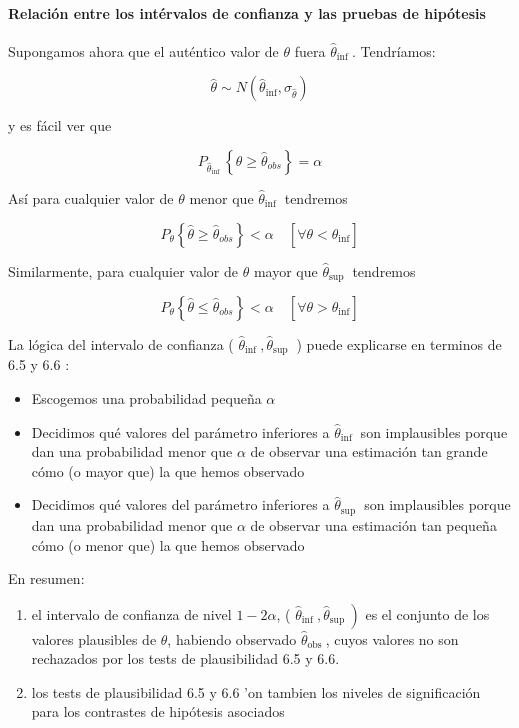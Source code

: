 \documentclass[
]{article}
\providecommand{\tightlist}{%
  \setlength{\itemsep}{0pt}\setlength{\parskip}{0pt}}
\begin{document}
\paragraph{Relación entre los intérvalos de confianza y las pruebas de hipótesis}\label{relaciuxf3n-entre-los-intuxe9rvalos-de-confianza-y-las-pruebas-de-hipuxf3tesis}

Supongamos ahora que el auténtico valor de \(\theta\) fuera \(\hat{\theta}_{\text {ínf }}\). Tendríamos:

\[
\hat{\theta} \sim N\left(\hat{\theta}_{\mathrm{inf}}, \sigma_{\hat{\theta}}\right)
\]

y es fácil ver que

\[
P_{\hat{\theta}_{\text {inf }}}\left\{\hat{\theta} \geq \hat{\theta}_{o b s}\right\}=\alpha
\]

Así para cualquier valor de \(\theta\) menor que \(\hat{\theta}_{\text {inf }}\) tendremos

\[
P_{\theta}\left\{\hat{\theta} \geq \hat{\theta}_{o b s}\right\}<\alpha \quad\left[\forall \theta<\hat{\theta}_{\mathrm{inf}}\right]
\]

Similarmente, para cualquier valor de \(\theta\) mayor que \(\hat{\theta}_{\text {sup }}\) tendremos

\[
P_{\theta}\left\{\hat{\theta} \leq \hat{\theta}_{o b s}\right\}<\alpha \quad\left[\forall \theta>\hat{\theta}_{\mathrm{inf}}\right]
\]

La lógica del intervalo de confianza ( \(\hat{\theta}_{\text {inf }}, \hat{\theta}_{\text {sup }}\) ) puede explicarse en terminos de 6.5 y 6.6 :

\begin{itemize}
\tightlist
\item
  Escogemos una probabilidad pequeña \(\alpha\)
\item
  Decidimos qué valores del parámetro inferiores a \(\hat{\theta}_{\text {inf }}\) son implausibles porque dan una probabilidad menor que \(\alpha\) de observar una estimación tan grande cómo (o mayor que) la que hemos observado
\item
  Decidimos qué valores del parámetro inferiores a \(\hat{\theta}_{\text {sup }}\) son implausibles porque dan una probabilidad menor que \(\alpha\) de observar una estimación tan pequeña cómo (o menor que) la que hemos observado
\end{itemize}

En resumen:

\begin{enumerate}
\def\labelenumi{\arabic{enumi}.}
\tightlist
\item
  el intervalo de confianza de nivel \(1-2 \alpha\), ( \(\left.\hat{\theta}_{\text {inf }}, \hat{\theta}_{\text {sup }}\right)\) es el conjunto de los valores plausibles de \(\theta\), habiendo observado \(\hat{\theta}_{\text {obs }}\), cuyos valores no son rechazados por los tests de plausibilidad 6.5 y 6.6.
\item
  los tests de plausibilidad 6.5 y 6.6 'on tambien los niveles de significación para los contrastes de hipótesis asociados
\end{enumerate}
\end{document}
